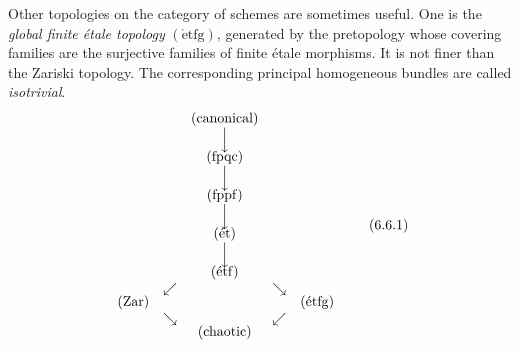 Other topologies on the category of schemes are sometimes useful. One is
the \emph{global finite \'{e}tale topology}
\((\mathrm{\acute etfg})\), generated by the pretopology whose covering
families are the surjective families of finite \'{e}tale morphisms. It is
not finer than the Zariski topology. The corresponding principal
homogeneous bundles are called \emph{isotrivial}.
\[
\begin{array}{ccccc}
  & & (\text{canonical}) & &\\
  & & \Big\downarrow & &\\[-0.25em]
  & & (\mathrm{fpqc}) & &\\
  & & \Big\downarrow & &\\[-0.25em]
  & & (\mathrm{fppf}) & &\\
  & & \Big\downarrow & &\\[-0.25em]
  & & (\mathrm{\acute et}) & &\\
  & & \Big\downarrow & &\\[-0.25em]
  & & (\mathrm{\acute etf}) & &\\
  & \swarrow & & \searrow &\\[-0.25em]
  (\mathrm{Zar}) & & & & (\mathrm{\acute etfg})\\
  & \searrow & & \swarrow &\\[-0.25em]
  & & (\text{chaotic}) & &
\end{array}
\tag{6.6.1}\label{sga3:iv:subsection:6:6:eq:6:6:1:01}
\]


